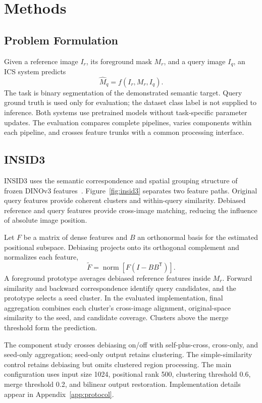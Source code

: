\section{Methods}
\subsection{Problem Formulation}
Given a reference image $I_r$, its foreground mask $M_r$, and a query image $I_q$, an ICS system predicts
\begin{equation}
    \widehat{M}_q=f(I_r,M_r,I_q).
\end{equation}
The task is binary segmentation of the demonstrated semantic target. Query ground truth is used only for evaluation; the dataset class label is not supplied to inference. Both systems use pretrained models without task-specific parameter updates. The evaluation compares complete pipelines, varies components within each pipeline, and crosses feature trunks with a common processing interface.

\subsection{INSID3}
INSID3 uses the semantic correspondence and spatial grouping structure of frozen DINOv3 features~\cite{insid3,dinov3}. Figure~\ref{fig:insid3} separates two feature paths. Original query features provide coherent clusters and within-query similarity. Debiased reference and query features provide cross-image matching, reducing the influence of absolute image position.



Let $F$ be a matrix of dense features and $B$ an orthonormal basis for the estimated positional subspace. Debiasing projects onto its orthogonal complement and normalizes each feature,
\begin{equation}
    \widetilde F=\operatorname{norm}\!\left[F(I-BB^{\mathsf T})\right].
\end{equation}
A foreground prototype averages debiased reference features inside $M_r$. Forward similarity and backward correspondence identify query candidates, and the prototype selects a seed cluster. In the evaluated implementation, final aggregation combines each cluster's cross-image alignment, original-space similarity to the seed, and candidate coverage. Clusters above the merge threshold form the prediction.

The component study crosses debiasing on/off with self-plus-cross, cross-only, and seed-only aggregation; seed-only output retains clustering. The simple-similarity control retains debiasing but omits clustered region processing. The main configuration uses input size 1024, positional rank 500, clustering threshold 0.6, merge threshold 0.2, and bilinear output restoration. Implementation details appear in Appendix~\ref{app:protocol}.

